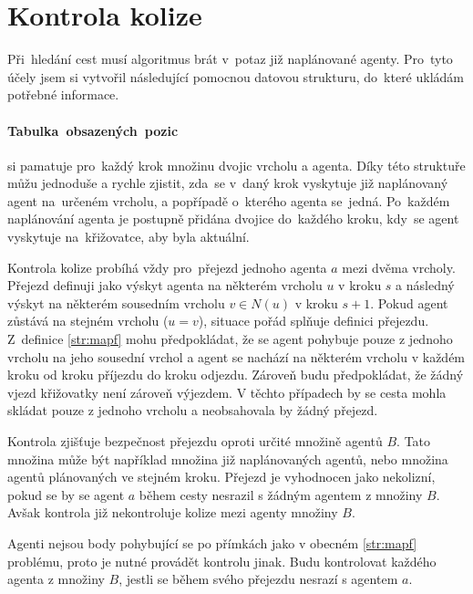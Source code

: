 \section{Kontrola kolize}\label{sec:kolize}


Při~hledání cest musí algoritmus brát v~potaz již naplánované agenty.
Pro~tyto účely jsem si vytvořil následující pomocnou datovou strukturu, do~které ukládám potřebné informace.

\paragraph{Tabulka~obsazených~pozic}\label{par:obsazene_pozice} si pamatuje pro~každý krok množinu dvojic vrcholu a agenta.
Díky této struktuře můžu jednoduše a rychle zjistit,
zda~se v~daný krok vyskytuje již naplánovaný agent na~určeném vrcholu, a popřípadě o~kterého agenta se~jedná.
Po~každém naplánování agenta je postupně přidána dvojice do~každého kroku, kdy~se agent vyskytuje na~křižovatce,
aby byla  aktuální.

Kontrola kolize probíhá vždy pro~přejezd jednoho agenta $a$ mezi dvěma vrcholy.
Přejezd definuji jako výskyt agenta na některém vrcholu $u$ v kroku $s$
a následný výskyt na některém sousedním vrcholu $v \in N(u)$ v kroku $s + 1$.
Pokud agent zůstává na stejném vrcholu ($u = v$), situace pořád splňuje definici přejezdu.
Z~definice \ref{str:mapf} mohu předpokládat, že se agent pohybuje pouze z jednoho vrcholu na jeho sousední vrchol a
agent se nachází na některém vrcholu v každém kroku od kroku příjezdu do kroku odjezdu.
Zároveň budu předpokládat, že žádný vjezd křižovatky není zároveň výjezdem.
V těchto případech by se cesta mohla skládat pouze z jednoho vrcholu a neobsahovala by žádný přejezd.

Kontrola zjišťuje bezpečnost přejezdu oproti určité množině agentů $B$.
Tato množina může být například množina již naplánovaných agentů, nebo množina agentů plánovaných ve stejném kroku.
Přejezd je vyhodnocen jako nekolizní, pokud se by se agent $a$ během cesty nesrazil s žádným agentem z množiny $B$.
Avšak kontrola již nekontroluje kolize mezi agenty množiny $B$.

Agenti nejsou body pohybující se po přímkách jako v obecném \ref{str:mapf} problému,
proto je nutné provádět kontrolu jinak.
Budu kontrolovat každého agenta z množiny $B$, jestli se během svého přejezdu nesrazí s agentem $a$.

